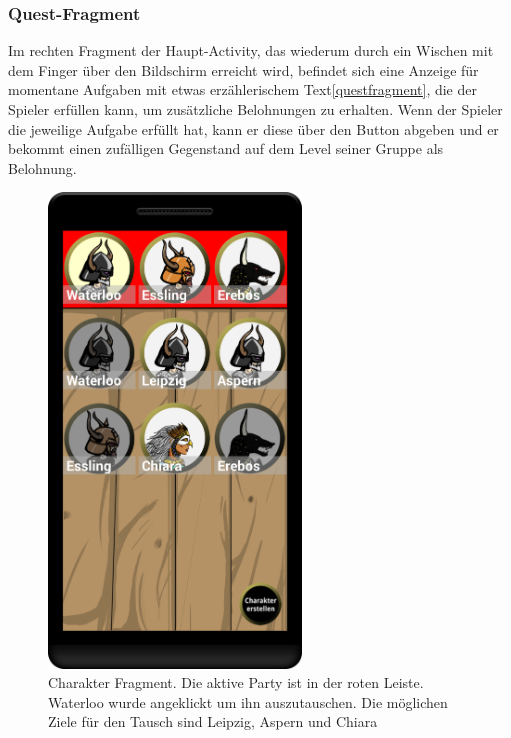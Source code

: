 \documentclass[extern,palatino]{cgBA}
\begin{document}
\subsubsection{Quest-Fragment}
Im rechten Fragment der Haupt-Activity, das wiederum durch ein Wischen mit dem Finger über den Bildschirm erreicht wird, befindet sich eine Anzeige für momentane Aufgaben mit etwas erzählerischem Text\ref{questfragment}, die der Spieler erfüllen kann, um zusätzliche Belohnungen zu erhalten. Wenn der Spieler die jeweilige Aufgabe erfüllt hat, kann er diese über den Button abgeben und er bekommt einen zufälligen Gegenstand auf dem Level seiner Gruppe als Belohnung.
	
	
\newpage
\begin{figure}[H] 
		\centering
		\includegraphics[width=0.6\textwidth]{charfragment.png}
		\caption{Charakter Fragment. Die aktive Party ist in der roten Leiste. Waterloo wurde angeklickt um ihn auszutauschen. Die möglichen Ziele für den Tausch sind Leipzig, Aspern und Chiara}
		\label{charfragment}
\end{figure} 
\end{document}
